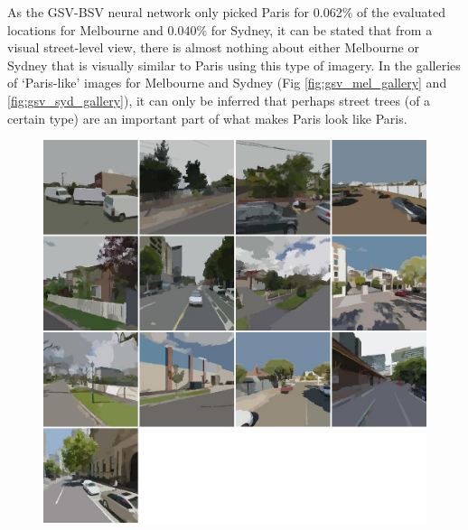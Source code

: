 \documentclass[10pt,letterpaper]{article}
\begin{document}
As the GSV-BSV neural network only picked Paris for 0.062\% of the evaluated locations for Melbourne and 0.040\% for Sydney, it can be stated that from a visual street-level view, there is almost nothing about either Melbourne or Sydney that is visually similar to Paris using this type of imagery. In the galleries of `Paris-like' images for Melbourne and Sydney (Fig \ref{fig:gsv_mel_gallery} and  \ref{fig:gsv_syd_gallery}), it can only be inferred that perhaps street trees (of a certain type) are an important part of what makes Paris look like Paris.

\begin{figure}[!htbp]
\centering    
\includegraphics[scale=0.35]{Images/PlosOne/Fig12.png}  

\end{figure}
\end{document}
